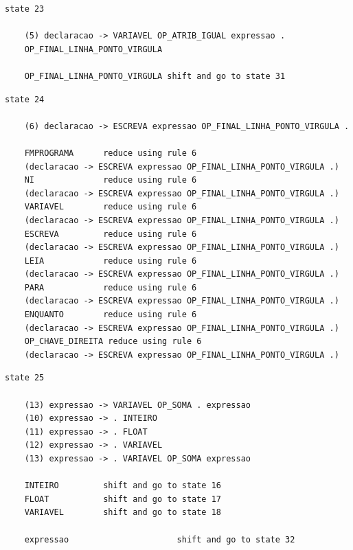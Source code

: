 \documentclass[a4paper,12pt]{article}
\begin{document}
\begin{verbatim}
state 23

    (5) declaracao -> VARIAVEL OP_ATRIB_IGUAL expressao . 
    OP_FINAL_LINHA_PONTO_VIRGULA

    OP_FINAL_LINHA_PONTO_VIRGULA shift and go to state 31

\end{verbatim}

\begin{verbatim}
state 24

    (6) declaracao -> ESCREVA expressao OP_FINAL_LINHA_PONTO_VIRGULA .

    FMPROGRAMA      reduce using rule 6 
    (declaracao -> ESCREVA expressao OP_FINAL_LINHA_PONTO_VIRGULA .)
    NI              reduce using rule 6 
    (declaracao -> ESCREVA expressao OP_FINAL_LINHA_PONTO_VIRGULA .)
    VARIAVEL        reduce using rule 6 
    (declaracao -> ESCREVA expressao OP_FINAL_LINHA_PONTO_VIRGULA .)
    ESCREVA         reduce using rule 6 
    (declaracao -> ESCREVA expressao OP_FINAL_LINHA_PONTO_VIRGULA .)
    LEIA            reduce using rule 6 
    (declaracao -> ESCREVA expressao OP_FINAL_LINHA_PONTO_VIRGULA .)
    PARA            reduce using rule 6 
    (declaracao -> ESCREVA expressao OP_FINAL_LINHA_PONTO_VIRGULA .)
    ENQUANTO        reduce using rule 6 
    (declaracao -> ESCREVA expressao OP_FINAL_LINHA_PONTO_VIRGULA .)
    OP_CHAVE_DIREITA reduce using rule 6 
    (declaracao -> ESCREVA expressao OP_FINAL_LINHA_PONTO_VIRGULA .)

\end{verbatim}

\begin{verbatim}
state 25

    (13) expressao -> VARIAVEL OP_SOMA . expressao
    (10) expressao -> . INTEIRO
    (11) expressao -> . FLOAT
    (12) expressao -> . VARIAVEL
    (13) expressao -> . VARIAVEL OP_SOMA expressao

    INTEIRO         shift and go to state 16
    FLOAT           shift and go to state 17
    VARIAVEL        shift and go to state 18

    expressao                      shift and go to state 32

\end{verbatim}
\end{document}
